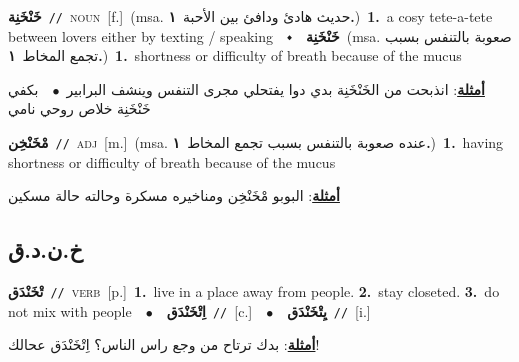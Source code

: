 \documentclass[10pt,a4paper,twoside]{article} %
\begin{document}
\begin{multicols}{2}
{\setlength\topsep{0pt}\textbf{\foreignlanguage{arabic}{خَنْخَنِة}}\ {\color{gray}\texttt{//}\color{black}}\ \textsc{noun}\ [f.]\ \color{gray}(msa. \foreignlanguage{arabic}{حديث هادئ ودافئ بين الأحبة}~\foreignlanguage{arabic}{\textbf{١.}})\color{black}\ \textbf{1.}~a cosy tete-a-tete between lovers either by texting / speaking\ \ $\smblkdiamond$\ \ \setlength\topsep{0pt}\textbf{\foreignlanguage{arabic}{خَنْخَنِة}}\ \color{gray}(msa. \foreignlanguage{arabic}{صعوبة بالتنفس بسبب تجمع المخاط}~\foreignlanguage{arabic}{\textbf{١.}})\color{black}\ \textbf{1.}~shortness or difficulty of breath because of the mucus\  \begin{flushright}\color{gray}\foreignlanguage{arabic}{\textbf{\underline{\foreignlanguage{arabic}{أمثلة}}}: انذبحت من الخَنْخَنِة بدي دوا يفتحلي مجرى التنفس وينشف البرابير\ $\bullet$\ \  بكفي خَنْخَنِة خلاص روحي نامي}\end{flushright}\color{black}} \vspace{2mm}

{\setlength\topsep{0pt}\textbf{\foreignlanguage{arabic}{مْخَنْخِن}}\ {\color{gray}\texttt{//}\color{black}}\ \textsc{adj}\ [m.]\ \color{gray}(msa. \foreignlanguage{arabic}{عنده صعوبة بالتنفس بسبب تجمع المخاط}~\foreignlanguage{arabic}{\textbf{١.}})\color{black}\ \textbf{1.}~having shortness or difficulty of breath because of the mucus\  \begin{flushright}\color{gray}\foreignlanguage{arabic}{\textbf{\underline{\foreignlanguage{arabic}{أمثلة}}}: البوبو مْخَنْخِن ومناخيره مسكرة وحالته حالة مسكين}\end{flushright}\color{black}} \vspace{2mm}

\vspace{-3mm}
\subsection*{\color{blue}\foreignlanguage{arabic}{خ.ن.د.ق}\color{blue}{}} 

{\setlength\topsep{0pt}\textbf{\foreignlanguage{arabic}{تْخَنْدَق}}\ {\color{gray}\texttt{//}\color{black}}\ \textsc{verb}\ [p.]\ \textbf{1.}~live in a place away from people.  \textbf{2.}~stay closeted.  \textbf{3.}~do not mix with people\ \ $\bullet$\ \ \setlength\topsep{0pt}\textbf{\foreignlanguage{arabic}{اِتْخَنْدَق}}\ {\color{gray}\texttt{//}\color{black}}\ [c.]\ \ $\bullet$\ \ \setlength\topsep{0pt}\textbf{\foreignlanguage{arabic}{يِتْخَنْدَق}}\ {\color{gray}\texttt{//}\color{black}}\ [i.]\  \begin{flushright}\color{gray}\foreignlanguage{arabic}{\textbf{\underline{\foreignlanguage{arabic}{أمثلة}}}: بدك ترتاح من وجع راس الناس؟ اِتْخَنْدَق عحالك!}\end{flushright}\color{black}} \vspace{2mm}


\end{multicols}
\end{document}
